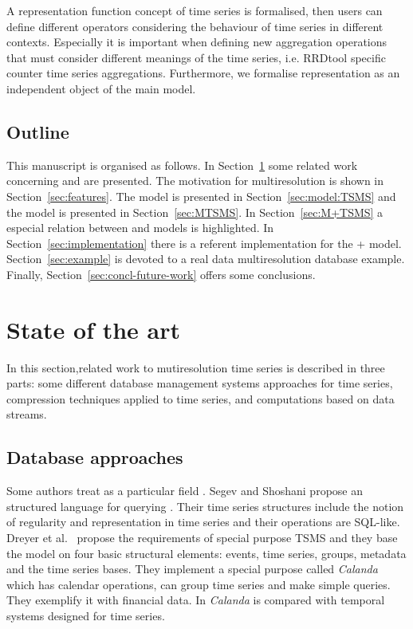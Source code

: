 A representation function concept of time series is formalised, then
users can define different operators considering the behaviour of time
series in different contexts. Especially it is important when defining
new aggregation operations that must consider different meanings of
the time series, i.e. RRDtool specific counter time series
aggregations. Furthermore, we formalise representation as an
independent object of the main model.




\subsection{Outline}

This manuscript is organised as follows.  In
Section~\ref{sec:related-work} some related work concerning
 and  are presented.  The motivation for
multiresolution is shown in Section~\ref{sec:features}.  The
 model is presented in Section~\ref{sec:model:TSMS} and the
 model is presented in Section~\ref{sec:MTSMS}. In
Section~\ref{sec:M+TSMS} a especial relation between  and
 models is highlighted.  In
Section~\ref{sec:implementation} there is a referent implementation
for the + model.  Section~\ref{sec:example} is
devoted to a real data multiresolution database example.  Finally,
Section~\ref{sec:concl-future-work} offers some conclusions.






\section{State of the art}
\label{sec:related-work}

In this section,related work to mutiresolution time series is
described in three parts: some different database management systems
approaches for time series, compression techniques applied to time
series, and computations based on data streams.




\subsection{Database approaches}

Some authors treat  as a particular  field
\cite{last01}.  Segev and Shoshani \cite{segev87:sigmod} propose an
structured language for querying . Their time series
structures include the notion of regularity and representation in time
series and their operations are SQL-like.  Dreyer et al.\
\cite{dreyer94} propose the requirements of special purpose TSMS and
they base the model on four basic structural elements: events, time
series, groups, metadata and the time series bases. They implement a
special purpose \acro{TSMS} called \emph{Calanda} which has calendar
operations, can group time series and make simple queries. They
exemplify it with financial data. In \cite{schmidt95} \emph{Calanda}
is compared with temporal systems designed for time series.



